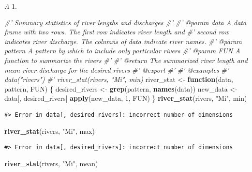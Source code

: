 \documentclass[
]{book}
\newenvironment{Shaded}{\begin{snugshade}}{\end{snugshade}}
\newcommand{\CommentTok}[1]{\textcolor[rgb]{0.56,0.35,0.01}{\textit{#1}}}
\newcommand{\ControlFlowTok}[1]{\textcolor[rgb]{0.13,0.29,0.53}{\textbf{#1}}}
\newcommand{\DecValTok}[1]{\textcolor[rgb]{0.00,0.00,0.81}{#1}}
\newcommand{\KeywordTok}[1]{\textcolor[rgb]{0.13,0.29,0.53}{\textbf{#1}}}
\newcommand{\NormalTok}[1]{#1}
\newcommand{\StringTok}[1]{\textcolor[rgb]{0.31,0.60,0.02}{#1}}
\begin{document}
\emph{A} 1.

\begin{Shaded}
\begin{Highlighting}[]
\CommentTok{#' Summary statistics of river lengths and discharges}
\CommentTok{#'}
\CommentTok{#' @param data A data frame with two rows. The first row indicates river length and}
\CommentTok{#'   second row indicates river discharge. The columns of data indicate river names.}
\CommentTok{#' @param pattern A pattern by which to include only particular rivers}
\CommentTok{#' @param FUN A function to summarize the rivers}
\CommentTok{#'}
\CommentTok{#' @return The summarized river length and mean river discharge for the desired rivers}
\CommentTok{#' @export}
\CommentTok{#'}
\CommentTok{#' @examples}
\CommentTok{#' data("rivers")}
\CommentTok{#' river_stat(rivers, "Mi", min)}
\NormalTok{river_stat <-}\StringTok{ }\ControlFlowTok{function}\NormalTok{(data, pattern, FUN) \{}
\NormalTok{  desired_rivers <-}\StringTok{ }\KeywordTok{grep}\NormalTok{(pattern, }\KeywordTok{names}\NormalTok{(data))}
\NormalTok{  new_data <-}\StringTok{ }\NormalTok{data[, desired_rivers]}
  \KeywordTok{apply}\NormalTok{(new_data, }\DecValTok{1}\NormalTok{, FUN)}
\NormalTok{\}}
\KeywordTok{river_stat}\NormalTok{(rivers, }\StringTok{"Mi"}\NormalTok{, min)}
\end{Highlighting}
\end{Shaded}

\begin{verbatim}
#> Error in data[, desired_rivers]: incorrect number of dimensions
\end{verbatim}

\begin{Shaded}
\begin{Highlighting}[]
\KeywordTok{river_stat}\NormalTok{(rivers, }\StringTok{"Mi"}\NormalTok{, max)}
\end{Highlighting}
\end{Shaded}

\begin{verbatim}
#> Error in data[, desired_rivers]: incorrect number of dimensions
\end{verbatim}

\begin{Shaded}
\begin{Highlighting}[]
\KeywordTok{river_stat}\NormalTok{(rivers, }\StringTok{"Mi"}\NormalTok{, mean)}
\end{Highlighting}
\end{Shaded}
\end{document}
